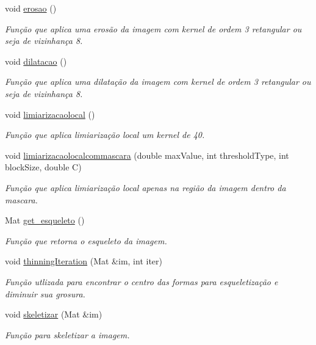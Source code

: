 \begin{DoxyCompactItemize}
void \mbox{\hyperlink{classimagem_a7ece85b1d08fdf8090ef0609526580ab}{erosao}} ()
\begin{DoxyCompactList}\small\item\em Função que aplica uma erosão da imagem com kernel de ordem 3 retangular ou seja de vizinhança 8. \end{DoxyCompactList}\item 
void \mbox{\hyperlink{classimagem_ada5ccf2e3115538ae83f81fc8196518f}{dilatacao}} ()
\begin{DoxyCompactList}\small\item\em Função que aplica uma dilatação da imagem com kernel de ordem 3 retangular ou seja de vizinhança 8. \end{DoxyCompactList}\item 
void \mbox{\hyperlink{classimagem_a1a3b8c5e2b35c7864a23e105e98b66f0}{limiarizacaolocal}} ()
\begin{DoxyCompactList}\small\item\em Função que aplica limiarização local um kernel de 40. \end{DoxyCompactList}\item 
void \mbox{\hyperlink{classimagem_ae80cd028fa41af6d5c58f6125109aac0}{limiarizacaolocalcommascara}} (double max\+Value, int threshold\+Type, int block\+Size, double C)
\begin{DoxyCompactList}\small\item\em Função que aplica limiarização local apenas na região da imagem dentro da mascara. \end{DoxyCompactList}\item 
Mat \mbox{\hyperlink{classimagem_a68615db6ed7ab0639ba5bc0c77e9552e}{get\+\_\+esqueleto}} ()
\begin{DoxyCompactList}\small\item\em Função que retorna o esqueleto da imagem. \end{DoxyCompactList}\item 
void \mbox{\hyperlink{classimagem_a37b3c4152a098a5e76195d4600e60ed7}{thinning\+Iteration}} (Mat \&im, int iter)
\begin{DoxyCompactList}\small\item\em Função utlizada para encontrar o centro das formas para esqueletização e diminuir sua grosura. \end{DoxyCompactList}\item 
void \mbox{\hyperlink{classimagem_a9e822c786769377a6eadea8d73437e7a}{skeletizar}} (Mat \&im)
\begin{DoxyCompactList}\small\item\em Função para skeletizar a imagem. \end{DoxyCompactList}\item 

\end{DoxyCompactItemize}
